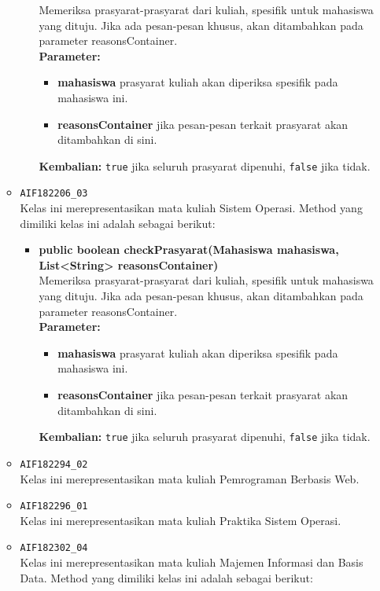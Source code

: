 \begin{enumerate}
\begin{itemize}
\begin{itemize}
			Memeriksa prasyarat-prasyarat dari kuliah, spesifik untuk mahasiswa yang dituju. Jika ada pesan-pesan khusus, akan ditambahkan pada parameter reasonsContainer.\\
			\textbf{Parameter:}
			\begin{itemize}
				\item \textbf{mahasiswa} prasyarat kuliah akan diperiksa spesifik pada mahasiswa ini.
				\item \textbf{reasonsContainer} jika pesan-pesan terkait prasyarat akan ditambahkan di sini.
			\end{itemize}
			\textbf{Kembalian:} \texttt{true} jika seluruh prasyarat dipenuhi, \texttt{false} jika tidak.
		\end{itemize}
		\item \texttt{AIF182206\_03} \\
		Kelas ini merepresentasikan mata kuliah Sistem Operasi. Method yang dimiliki kelas ini adalah sebagai berikut: 
		\begin{itemize}
			\item \textbf{public boolean checkPrasyarat(Mahasiswa mahasiswa, List<String> reasonsContainer)}\\
			Memeriksa prasyarat-prasyarat dari kuliah, spesifik untuk mahasiswa yang dituju. Jika ada pesan-pesan khusus, akan ditambahkan pada parameter reasonsContainer.\\
			\textbf{Parameter:}
			\begin{itemize}
				\item \textbf{mahasiswa} prasyarat kuliah akan diperiksa spesifik pada mahasiswa ini.
				\item \textbf{reasonsContainer} jika pesan-pesan terkait prasyarat akan ditambahkan di sini.
			\end{itemize}
			\textbf{Kembalian:} \texttt{true} jika seluruh prasyarat dipenuhi, \texttt{false} jika tidak.
		\end{itemize}
		\item \texttt{AIF182294\_02} \\
		Kelas ini merepresentasikan mata kuliah Pemrograman Berbasis Web.
		\item \texttt{AIF182296\_01} \\
		Kelas ini merepresentasikan mata kuliah Praktika Sistem Operasi.
		\item \texttt{AIF182302\_04} \\
		Kelas ini merepresentasikan mata kuliah Majemen Informasi dan Basis Data. Method yang dimiliki kelas ini adalah sebagai berikut: 

\end{itemize}
\end{enumerate}
